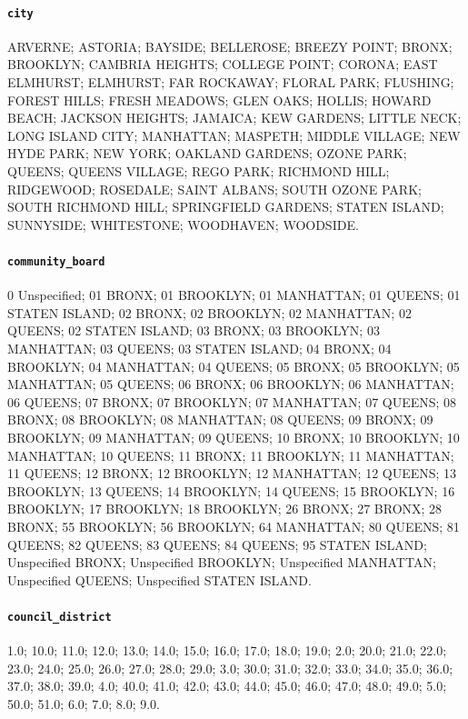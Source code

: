 \paragraph{\texttt{city}} ARVERNE; ASTORIA; BAYSIDE; BELLEROSE; BREEZY POINT; BRONX; BROOKLYN; CAMBRIA HEIGHTS; COLLEGE POINT; CORONA; EAST ELMHURST; ELMHURST; FAR ROCKAWAY; FLORAL PARK; FLUSHING; FOREST HILLS; FRESH MEADOWS; GLEN OAKS; HOLLIS; HOWARD BEACH; JACKSON HEIGHTS; JAMAICA; KEW GARDENS; LITTLE NECK; LONG ISLAND CITY; MANHATTAN; MASPETH; MIDDLE VILLAGE; NEW HYDE PARK; NEW YORK; OAKLAND GARDENS; OZONE PARK; QUEENS; QUEENS VILLAGE; REGO PARK; RICHMOND HILL; RIDGEWOOD; ROSEDALE; SAINT ALBANS; SOUTH OZONE PARK; SOUTH RICHMOND HILL; SPRINGFIELD GARDENS; STATEN ISLAND; SUNNYSIDE; WHITESTONE; WOODHAVEN; WOODSIDE.

\paragraph{\texttt{community\_\allowbreak{}board}} 0 Unspecified; 01 BRONX; 01 BROOKLYN; 01 MANHATTAN; 01 QUEENS; 01 STATEN ISLAND; 02 BRONX; 02 BROOKLYN; 02 MANHATTAN; 02 QUEENS; 02 STATEN ISLAND; 03 BRONX; 03 BROOKLYN; 03 MANHATTAN; 03 QUEENS; 03 STATEN ISLAND; 04 BRONX; 04 BROOKLYN; 04 MANHATTAN; 04 QUEENS; 05 BRONX; 05 BROOKLYN; 05 MANHATTAN; 05 QUEENS; 06 BRONX; 06 BROOKLYN; 06 MANHATTAN; 06 QUEENS; 07 BRONX; 07 BROOKLYN; 07 MANHATTAN; 07 QUEENS; 08 BRONX; 08 BROOKLYN; 08 MANHATTAN; 08 QUEENS; 09 BRONX; 09 BROOKLYN; 09 MANHATTAN; 09 QUEENS; 10 BRONX; 10 BROOKLYN; 10 MANHATTAN; 10 QUEENS; 11 BRONX; 11 BROOKLYN; 11 MANHATTAN; 11 QUEENS; 12 BRONX; 12 BROOKLYN; 12 MANHATTAN; 12 QUEENS; 13 BROOKLYN; 13 QUEENS; 14 BROOKLYN; 14 QUEENS; 15 BROOKLYN; 16 BROOKLYN; 17 BROOKLYN; 18 BROOKLYN; 26 BRONX; 27 BRONX; 28 BRONX; 55 BROOKLYN; 56 BROOKLYN; 64 MANHATTAN; 80 QUEENS; 81 QUEENS; 82 QUEENS; 83 QUEENS; 84 QUEENS; 95 STATEN ISLAND; Unspecified BRONX; Unspecified BROOKLYN; Unspecified MANHATTAN; Unspecified QUEENS; Unspecified STATEN ISLAND.

\paragraph{\texttt{council\_\allowbreak{}district}} 1.0; 10.0; 11.0; 12.0; 13.0; 14.0; 15.0; 16.0; 17.0; 18.0; 19.0; 2.0; 20.0; 21.0; 22.0; 23.0; 24.0; 25.0; 26.0; 27.0; 28.0; 29.0; 3.0; 30.0; 31.0; 32.0; 33.0; 34.0; 35.0; 36.0; 37.0; 38.0; 39.0; 4.0; 40.0; 41.0; 42.0; 43.0; 44.0; 45.0; 46.0; 47.0; 48.0; 49.0; 5.0; 50.0; 51.0; 6.0; 7.0; 8.0; 9.0.

